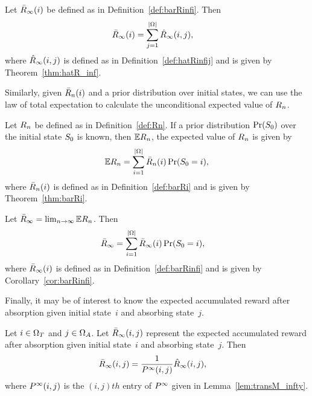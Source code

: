 \begin{mycor}
\label{cor:barRinfi}
	Let $\bar{R}_{\infty}(i)$ be defined as in Definition~\ref{def:barRinfi}.  Then
\begin{align}
	\bar{R}_{\infty}(i) &=  \sum_{j = 1}^{|\Omega|} \hat{R}_{\infty}(i, j),
\end{align}
where $\hat{R}_{\infty}(i, j)$ is defined as in Definition~\ref{def:hatRinfij} and is given by Theorem~\ref{thm:hatR_inf}.
\end{mycor}

Similarly, given $\bar{R}_{n}(i)$ and a prior distribution over initial states, we can use the law of total expectation to calculate the unconditional expected value of $R_{n}$. 

\begin{theorem}
\label{thm:barR_prior}
	Let $R_{n}$ be defined as in Definition~\ref{def:Rn}. If a prior distribution $\operatorname{Pr}(S_{0})$ over the initial state $S_{0}$ is known, then $\mathbb{E}R_{n}$, the expected value of $R_{n}$ is given by
	\begin{equation}
		\mathbb{E}R_{n} = \sum_{i = 1}^{|\Omega|} \bar{R}_{n}(i) \operatorname{Pr}(S_{0} = i),
	\end{equation}
where $\bar{R}_{n}(i)$ is defined as in Definition~\ref{def:barRi} and is given by Theorem~\ref{thm:barRi}.
\end{theorem}
\begin{mycor}
	Let $\bar{R}_{\infty} = \lim_{n \to \infty} \mathbb{E}R_{n}$.  Then 
\label{cor:barRinf}
\begin{align}
	\bar{R}_{\infty} &=  \sum_{i= 1}^{|\Omega|} \bar{R}_{\infty}(i)\operatorname{Pr}(S_{0} = i),
\end{align}
where $\bar{R}_{\infty}(i)$ is defined as in Definition~\ref{def:barRinfi} and is given by Corollary~\ref{cor:barRinfi}.
\end{mycor}

Finally, it may be of interest to know the expected accumulated reward after absorption given initial state~$i$ and absorbing state~$j$.

\begin{theorem}
\label{thm:barRinf_absorb}
	Let $i \in \Omega_{T}$ and $j \in \Omega_{A}$.  Let $\bar{R}_{\infty}(i, j)$ represent the expected accumulated reward after absorption given initial state~$i$ and absorbing state~$j$.  Then 
	\begin{align}
		\bar{R}_{\infty}(i, j) &=  \frac{1}{P^{\infty}(i, j)}\hat{R}_{\infty}(i, j), 
	\end{align}
	where $P^{\infty}(i, j)$ is the $(i, j)th$ entry of $P^{\infty}$ given in Lemma~\ref{lem:transM_infty}.
\end{theorem}
